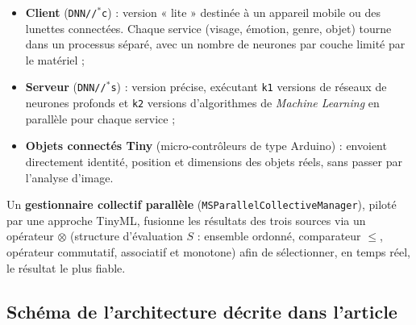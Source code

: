 \documentclass[11pt,a4paper]{article}
\begin{document}
\begin{itemize}
    \item \textbf{Client} (\texttt{DNN//\(^{*}\)c}) : version « lite »
    destinée à un appareil mobile ou des lunettes connectées. Chaque
    service (visage, émotion, genre, objet) tourne dans un processus
    séparé, avec un nombre de neurones par couche limité par le matériel ;
    \item \textbf{Serveur} (\texttt{DNN//\(^{*}\)s}) : version précise,
    exécutant \texttt{k1} versions de réseaux de neurones profonds et
    \texttt{k2} versions d'algorithmes de \textit{Machine Learning} en
    parallèle pour chaque service ;
    \item \textbf{Objets connectés Tiny} (micro-contrôleurs de type
    Arduino) : envoient directement identité, position et dimensions des
    objets réels, sans passer par l'analyse d'image.
\end{itemize}

Un \textbf{gestionnaire collectif parallèle}
(\texttt{MSParallelCollectiveManager}), piloté par une approche TinyML,
fusionne les résultats des trois sources via un opérateur \(\otimes\)
(structure d'évaluation \(S\) : ensemble ordonné, comparateur \(\leq\),
opérateur commutatif, associatif et monotone) afin de sélectionner, en
temps réel, le résultat le plus fiable.

\subsection{Schéma de l'architecture décrite dans l'article}
\end{document}
